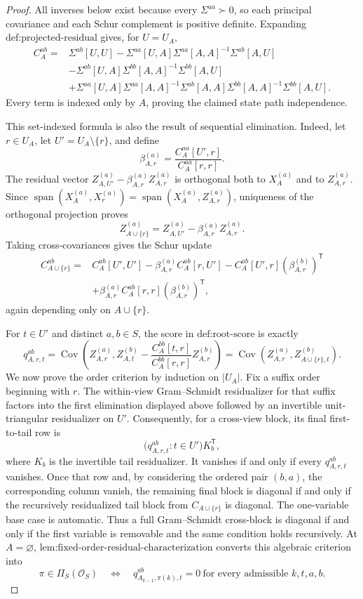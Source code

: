 \documentclass{article}
\begin{document}
\begin{proof}
All inverses below exist because every \(\Sigma^{aa}\succ0\), so each principal covariance and each Schur complement is positive definite.  Expanding \(\text{def:projected-residual}\) gives, for \(U=U_A\),
\[
\begin{aligned}
C_A^{ab}={}&\Sigma^{ab}[U,U]
-\Sigma^{aa}[U,A]\Sigma^{aa}[A,A]^{-1}\Sigma^{ab}[A,U]\\
&-\Sigma^{ab}[U,A]\Sigma^{bb}[A,A]^{-1}\Sigma^{bb}[A,U]\\
&+\Sigma^{aa}[U,A]\Sigma^{aa}[A,A]^{-1}\Sigma^{ab}[A,A]
\Sigma^{bb}[A,A]^{-1}\Sigma^{bb}[A,U].
\end{aligned}
\]
Every term is indexed only by \(A\), proving the claimed state path independence.

This set-indexed formula is also the result of sequential elimination.  Indeed, let \(r\in U_A\), let \(U'=U_A\setminus\{r\}\), and define
\[
\beta_{A,r}^{(a)}=\frac{C_A^{aa}[U',r]}{C_A^{aa}[r,r]}.
\]
The residual vector \(Z_{A,U'}^{(a)}-\beta_{A,r}^{(a)}Z_{A,r}^{(a)}\) is orthogonal both to \(X_A^{(a)}\) and to \(Z_{A,r}^{(a)}\).  Since
\(\operatorname{span}(X_A^{(a)},X_r^{(a)})=\operatorname{span}(X_A^{(a)},Z_{A,r}^{(a)})\), uniqueness of the orthogonal projection proves
\[
Z_{A\cup\{r\}}^{(a)}=Z_{A,U'}^{(a)}-\beta_{A,r}^{(a)}Z_{A,r}^{(a)}.
\]
Taking cross-covariances gives the Schur update
\[
\begin{aligned}
C_{A\cup\{r\}}^{ab}={}&C_A^{ab}[U',U']
-\beta_{A,r}^{(a)}C_A^{ab}[r,U']
-C_A^{ab}[U',r](\beta_{A,r}^{(b)})^{\mathsf T}\\
&+\beta_{A,r}^{(a)}C_A^{ab}[r,r](\beta_{A,r}^{(b)})^{\mathsf T},
\end{aligned}
\]
again depending only on \(A\cup\{r\}\).

For \(t\in U'\) and distinct \(a,b\in S\), the score in \(\text{def:root-score}\) is exactly
\[
q_{A,r,t}^{ab}
=\operatorname{Cov}\!\left(Z_{A,r}^{(a)},
Z_{A,t}^{(b)}-\frac{C_A^{bb}[t,r]}{C_A^{bb}[r,r]}Z_{A,r}^{(b)}\right)
=\operatorname{Cov}\!\left(Z_{A,r}^{(a)},Z_{A\cup\{r\},t}^{(b)}\right).
\]
We now prove the order criterion by induction on \(\lvert U_A\rvert\).  Fix a suffix order beginning with \(r\).  The within-view Gram--Schmidt residualizer for that suffix factors into the first elimination displayed above followed by an invertible unit-triangular residualizer on \(U'\).  Consequently, for a cross-view block, its final first-to-tail row is
\[
\bigl(q_{A,r,t}^{ab}:t\in U'\bigr)K_b^{\mathsf T},
\]
where \(K_b\) is the invertible tail residualizer.  It vanishes if and only if every \(q_{A,r,t}^{ab}\) vanishes.  Once that row and, by considering the ordered pair \((b,a)\), the corresponding column vanish, the remaining final block is diagonal if and only if the recursively residualized tail block from \(C_{A\cup\{r\}}\) is diagonal.  The one-variable base case is automatic.  Thus a full Gram--Schmidt cross-block is diagonal if and only if the first variable is removable and the same condition holds recursively.  At \(A=\varnothing\), \(\text{lem:fixed-order-residual-characterization}\) converts this algebraic criterion into
\[
\pi\in\Pi_S(\mathcal O_S)\quad\Longleftrightarrow\quad
q_{A_{k-1},\pi(k),t}^{ab}=0
\ \text{for every admissible }k,t,a,b.
\]


\end{proof}
\end{document}
